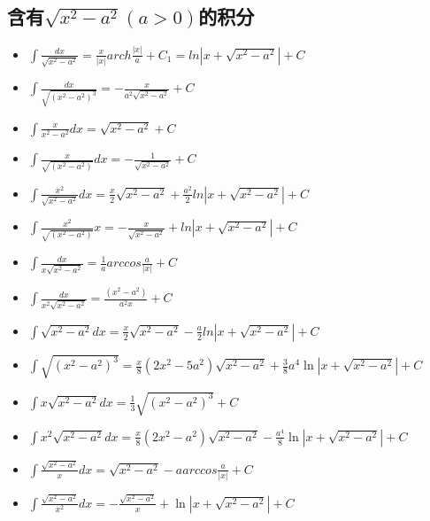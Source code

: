 \subsection{含有$\sqrt{x^2-a^2}(a>0)$的积分}
\begin{itemize}
	\item $\int\frac{dx}{\sqrt{x^2-a^2}}=\frac{x}{|x|}arch\frac{|x|}{a}+C_1=ln|x+\sqrt{x^2-a^2}|+C$
	\item $\int\frac{dx}{\sqrt{\left(x^2-a^2\right)^3}}=-\frac{x}{a^2\sqrt{x^2-a^2}}+C$
	\item $\int \frac{x}{x^2-a^2}dx=\sqrt{x^2-a^2}+C$
	\item $\int\frac{x}{\sqrt{(x^2-a^2)}}dx=-\frac{1}{\sqrt{x^2-a^2}}+C$
	\item $\int\frac{x^2}{\sqrt{x^2-a^2}}dx=\frac{x}{2}\sqrt{x^2-a^2}+\frac{a^2}{2}ln|x+\sqrt{x^2-a^2}|+C$
	\item $\int\frac{x^2}{\sqrt{\left(x^2-a^2\right)}}x=-\frac{x}{\sqrt{x^2-a^2}}+ln|x+\sqrt{x^2-a^2}|+C$
	\item $\int\frac{dx}{x\sqrt{x^2-a^2}}=\frac{1}{a}arccos\frac{a}{|x|}+C$
	\item $\int\frac{dx}{x^2\sqrt{x^2-a^2}}=\frac{(x^2-a^2)}{a^2x}+C$
	\item $\int\sqrt{x^2-a^2}dx=\frac{x}{2}\sqrt{x^2-a^2}-\frac{a}{2}ln|x+\sqrt{x^2-a^2}|+C$
	\item $\int\sqrt{\left(x^2-a^2\right)^3}=\frac{x}{8}(2x^2-5a^2)\sqrt{x^2-a^2}+\frac{3}{8}a^4\ln|x+\sqrt{x^2-a^2}|+C$
	\item $\int x\sqrt{x^2-a^2}dx=\frac{1}{3}\sqrt{\left(x^2-a^2\right)^3}+C$
	\item $\int x^2\sqrt{x^2-a^2}dx=\frac{x}{8}(2x^2-a^2)\sqrt{x^2-a^2}-\frac{a^4}{8}\ln|x+\sqrt{x^2-a^2}|+C$
	\item $\int \frac{\sqrt{x^2-a^2}}{x}dx=\sqrt{x^2-a^2}-aarccos\frac{a}{|x|}+C$
	\item $\int\frac{\sqrt{x^2-a^2}}{x^2}dx=-\frac{\sqrt{x^2-a^2}}{x}+\ln|x+\sqrt{x^2-a^2}|+C$
\end{itemize}
